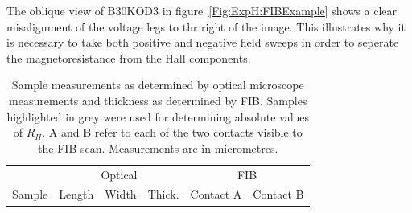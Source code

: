 The oblique view of B30KOD3 in figure~\ref{Fig:ExpH:FIBExample} shows a clear misalignment of the voltage legs to thr right of the image. This illustrates why it is necessary to take both positive and negative field sweeps in order to seperate the magnetoresistance from the Hall components.

\begin{table}
    \begin{center}
           \caption{Sample measurements as determined by optical microscope measurements and thickness as determined by \ac{FIB}. Samples highlighted in grey were used for determining absolute values of $R_H$. A and B refer to each of the two contacts visible to the \acs{FIB} scan. Measurements are in micrometres.}
        \begin{tabular}[htbp]{lrrrrr}
\toprule
	& \multicolumn{3}{c}{Optical}			& \multicolumn{2}{c}{\acs{FIB}}		\\
Sample  & Length	& Width		& Thick.	& Contact A    & Contact B    		\\


\end{tabular}
\end{center}
\end{table}
